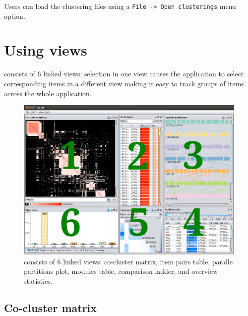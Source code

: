Users can load the clustering files using a \texttt{File -> Open clusterings} 
menu option.%


\section{Using \coral views}

\coral consists of 6 linked views: selection in one view causes the application 
to select corresponding items in a different view making it easy to track groups
of items across the whole application.

\begin{figure}[ht]
  \centering
  \includegraphics[width=\textwidth]{overview}
  \caption{\coral consists of 6 linked views: co-cluster matrix, item pairs 
    table, paralle partitions plot, modules table, comparison ladder, and 
    overview statistics.}
  \label{fig:overview}
\end{figure}


\subsection{Co-cluster matrix}

